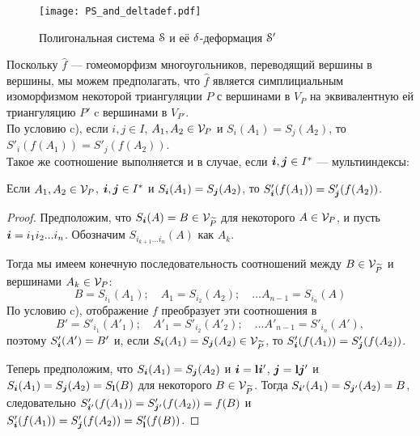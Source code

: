 \begin{figure}[H]
    \centering
    \texttt{[image: PS\_and\_deltadef.pdf]}
    \caption{Полигональная система ${\EuScript S}$ и её $\delta$-деформация ${\EuScript S}'$ }
    \label{img:ddef}
\end{figure}

Поскольку $\hat f$ --- гомеоморфизм многоугольников, переводящий вершины в вершины, мы можем предполагать, что $\hat f$ является симплициальным изоморфизмом некоторой триангуляции $P$ с вершинами в $V_P$ на эквивалентную ей триангуляцию $P'$ c вершинами в $V_{P'}$.\\ 
 
По условию c), если  $i,j\in I$, $A_1,A_2\in {\mathcal V}_P$ и $S_i(A_1)=S_j(A_2)$, то $S'_i( f(A_1))=S'_j(f(A_2))$.\\  Такое же соотношение выполняется и в случае, если ${\bm{i}},{\bm{j}}\in I^*$ --- мультииндексы:

\begin{lemma}\label{bibj}
Если $A_1,A_2\in {\mathcal V}_P$, ${\bm{i}},{\bm{j}}\in I^*$ и $S_{\bm{i}}(A_1)=S_{\bm{j}}(A_2)$, то $S'_{\bm{i}}( f(A_1))=S'_{\bm{j}}( f(A_2))$.
\end{lemma}
 
\begin{proof}
Предположим, что $S_{\bm{i}}(A)=B\in {\mathcal V}_{\widetilde P}$ для некоторого $A\in {\mathcal V}_P$, и пусть ${\bm{i}}=i_1i_2...i_n$. 
Обозначим $S_{i_{k+1}...i_n}(A)$ как $A_k$.

Тогда мы имеем конечную последовательность соотношений между $B\in {\mathcal V}_{\widetilde P}$ и вершинами $A_k\in{\mathcal V}_P$:\\
\begin{equation}\label{chn1}
B=S_{i_1}(A_1); \quad A_1=S_{i_2}(A_2); \quad \ldots A_{n-1}=S_{i_n}(A)
\end{equation}
По условию c),  отображение $f$ преобразует  эти соотношения  в  
\begin{equation}\label{chn2} 
B'=S'_{i_1}(A'_1); \quad A'_1=S'_{i_2}(A'_2); \quad \ldots  A'_{n-1}=S'_{i_n}(A'), 
\end{equation}
поэтому $S'_{\bm{i}}(A')=B'$ и, если $S_{\bm{i}}(A_1)=S_{\bm{j}}(A_2)\in {\mathcal V}_{{\widetilde P}}$, то $S'_{\bm{i}}(f(A_1))=S'_{\bm{j}}(f(A_2))$.

Теперь предположим,  что $S_{\bm{i}}(A_1)=S_{\bm{j}}(A_2)$ и ${\bm{i}}={\bf{l}}{\bm{i}}'$, ${\bm{j}}={\bf{l}}{\bm{j}}'$ и $S_{\bm{i}}(A_1)=S_{\bm{j}}(A_2)=S_{\bf{l}}(B)$ для некоторого $B\in {\mathcal V}_{\widetilde P}$. 
Тогда  $S_{{\bm{i}}'}(A_1)=S_{{\bm{j}}'}(A_2)=B$, следовательно $S'_{{\bm{i}}'}(f(A_1))=S'_{{\bm{j}}'}(f(A_2))=f(B)$ и
$S'_{{\bm{i}}}(f(A_1))=S'_{{\bm{j}}}(f(A_2))=S'_{\bf{l}}(f(B))$.
\end{proof}

